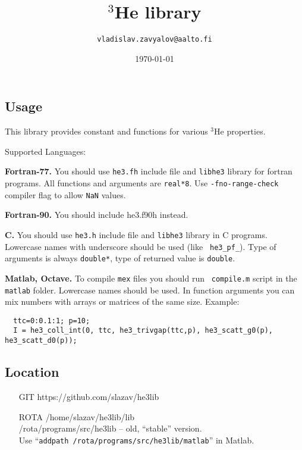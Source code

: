 \documentclass[a4paper]{article}
\begin{document}
\title{$^3$He library}
\date{\today}
\author{\tt vladislav.zavyalov@aalto.fi}
\maketitle

\subsection*{Usage}

This library provides constant and functions for various $^3$He properties.

\noindent Supported Languages:

{\bf Fortran-77.}
You should use {\tt he3.fh} include file and {\tt libhe3} library for
fortran programs. All functions and arguments are {\tt real*8}.
Use {\tt -fno-range-check} compiler flag to allow {\tt NaN} values.

{\bf Fortran-90.}
You should include he3.f90h instead.

{\bf C.} You should use {\tt he3.h} include file and {\tt libhe3} library
in C programs. Lowercase names with underscore should be used (like {\tt
he3\_pf\_}). Type of arguments is always {\tt double*}, type of returned
value is {\tt double}.

{\bf Matlab, Octave.} To compile {\tt mex} files you should run {\tt
compile.m} script in the {\tt matlab} folder. Lowercase names should be
used. In function arguments you can mix numbers with arrays or
matrices of the same size. Example:
\begin{verbatim}
  ttc=0:0.1:1; p=10;
  I = he3_coll_int(0, ttc, he3_trivgap(ttc,p), he3_scatt_g0(p), he3_scatt_d0(p));
\end{verbatim}

\subsection*{Location}
\begin{itemize}
\item[GIT]  https://github.com/slazav/he3lib
\item[ROTA]
/home/slazav/he3lib/lib\\
/rota/programs/src/he3lib -- old, ``stable'' version.\\
Use ``{\tt addpath /rota/programs/src/he3lib/matlab}'' in Matlab.
\end{itemize}


\end{document}

